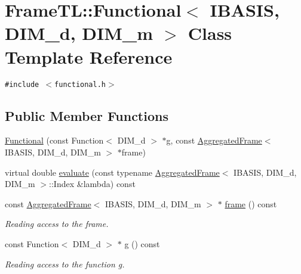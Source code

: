 \hypertarget{classFrameTL_1_1Functional}{
\section{FrameTL::Functional$<$ IBASIS, DIM\_\-d, DIM\_\-m $>$ Class Template Reference}
\label{classFrameTL_1_1Functional}
}
{\tt \#include $<$functional.h$>$}

\subsection*{Public Member Functions}
\begin{CompactItemize}
\item 
\hyperlink{classFrameTL_1_1Functional_83bf7391168b379d55c45f09f9e18dfb}{Functional} (const Function$<$ DIM\_\-d $>$ $\ast$g, const \hyperlink{classFrameTL_1_1AggregatedFrame}{AggregatedFrame}$<$ IBASIS, DIM\_\-d, DIM\_\-m $>$ $\ast$frame)
\item 
virtual double \hyperlink{classFrameTL_1_1Functional_e1cb262dd592892e2fbc616dbf370605}{evaluate} (const typename \hyperlink{classFrameTL_1_1AggregatedFrame}{AggregatedFrame}$<$ IBASIS, DIM\_\-d, DIM\_\-m $>$::Index \&lambda) const 
\item 
\hypertarget{classFrameTL_1_1Functional_09c20d5bbaad34e8e32175ea3fa8cc1a}{
const \hyperlink{classFrameTL_1_1AggregatedFrame}{AggregatedFrame}$<$ IBASIS, DIM\_\-d, DIM\_\-m $>$ $\ast$ \hyperlink{classFrameTL_1_1Functional_09c20d5bbaad34e8e32175ea3fa8cc1a}{frame} () const }
\label{classFrameTL_1_1Functional_09c20d5bbaad34e8e32175ea3fa8cc1a}

\begin{CompactList}\small\item\em Reading access to the frame. \item\end{CompactList}\item 
\hypertarget{classFrameTL_1_1Functional_a76df42e5c570d16affb516359f023cb}{
const Function$<$ DIM\_\-d $>$ $\ast$ \hyperlink{classFrameTL_1_1Functional_a76df42e5c570d16affb516359f023cb}{g} () const }
\label{classFrameTL_1_1Functional_a76df42e5c570d16affb516359f023cb}

\begin{CompactList}\small\item\em Reading access to the function g. \item\end{CompactList}\end{CompactItemize}
